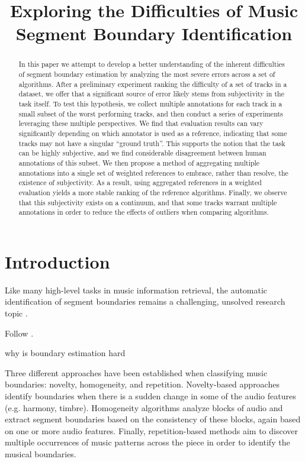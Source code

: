 \documentclass{article}
\title{Exploring the Difficulties of Music Segment Boundary Identification}
\begin{document}
%
\maketitle
%
\begin{abstract}
In this paper we attempt to develop a better understanding of the inherent difficulties of segment boundary estimation by analyzing the most severe errors across a set of algorithms.
After a preliminary experiment ranking the difficulty of a set of tracks in a dataset, we offer that a significant source of error likely stems from subjectivity in the task itself.
To test this hypothesis, we collect multiple annotations for each track in a small subset of the worst performing tracks, and then conduct a series of experiments leveraging these multiple perspectives.
We find that evaluation results can vary significantly depending on which annotator is used as a reference, indicating that some tracks may not have a singular ``ground truth''.
This supports the notion that the task can be highly subjective, and we find considerable disagreement between human annotations of this subset.
We then propose a method of aggregating multiple annotations into a single set of weighted references to embrace, rather than resolve, the existence of subjectivity.
As a result, using  aggregated references in a weighted evaluation yields a more stable ranking of the reference algorithms. 
Finally, we observe that this subjectivity exists on a continuum, and that some tracks warrant multiple annotations in order to reduce the effects of outliers when comparing algorithms.

  
\end{abstract}
%
\section{Introduction}\label{sec:introduction}

Like many high-level tasks in music information retrieval, the automatic identification of segment boundaries remains a challenging, unsolved research topic . 

Follow \cite{Grosche2010}.

why is boundary estimation hard

Three different approaches have been established when classifying music boundaries: novelty, homogeneity, and repetition\cite{Paulus2010}. 
Novelty-based approaches identify boundaries when there is a sudden change in some of the audio features (e.g. harmony, timbre).
Homogeneity algorithms analyze blocks of audio and extract segment boundaries based on the consistency of these blocks, again based on one or more audio features.
Finally, repetition-based methods aim to discover multiple occurrences of music patterns across the piece in order to identify the musical boundaries.
\end{document}
